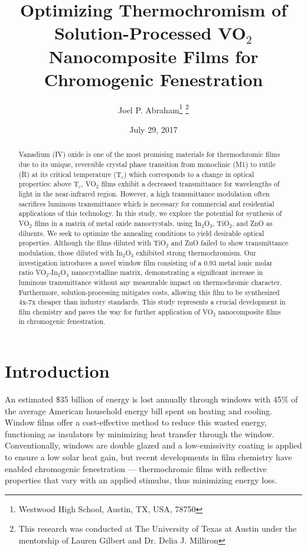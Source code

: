 \documentclass[a4paper]{article}
\title{Optimizing Thermochromism of Solution-Processed VO$_2$ Nanocomposite Films for Chromogenic Fenestration}
\date{July 29, 2017}
\author{Joel P. Abraham\footnote{Westwood High School, Austin, TX, USA, 78750} \footnote{This research was conducted at The University of Texas at Austin under the mentorship of Lauren Gilbert and Dr. Delia J. Milliron}}
\begin{document}
\maketitle


\begin{abstract}
Vanadium (IV) oxide is one of the most promising materials for thermochromic films due to its unique, reversible crystal phase transition from monoclinic (M1) to rutile (R) at its critical temperature (T$_c$) which corresponds to a change in optical properties: above T$_c$, VO$_2$ films exhibit a decreased transmittance for wavelengths of light in the near-infrared region. However, a high transmittance modulation often sacrifices luminous transmittance which is necessary for commercial and residential applications of this technology. In this study, we explore the potential for synthesis of VO$_2$ films in a matrix of metal oxide nanocrystals, using In$_2$O$_3$, TiO$_2$, and ZnO as diluents. We seek to optimize the annealing conditions to yield desirable optical properties. Although the films diluted with TiO$_2$ and ZnO failed to show transmittance modulation, those diluted with In$_2$O$_3$ exhibited strong thermochromism. Our investigation introduces a novel window film consisting of a 0.93 metal ionic molar ratio VO$_2$-In$_2$O$_3$ nanocrystalline matrix, demonstrating a significant increase in luminous transmittance without any measurable impact on thermochromic character. Furthermore, solution-processing mitigates costs, allowing this film to be synthesized 4x-7x cheaper than industry standards. This study represents a crucial development in film chemistry and paves the way for further application of VO$_2$ nanocomposite films in chromogenic fenestration.

\end{abstract}

\doublespacing
\section{Introduction}

An estimated \$35 billion of energy is lost annually through windows with 45\% of the average American household energy bill spent on heating and cooling. Window films offer a cost-effective method to reduce this wasted energy, functioning as insulators by minimizing heat transfer through the window. Conventionally, windows are double glazed and a low-emissivity coating is applied to ensure a low solar heat gain, but recent developments in film chemistry have enabled chromogenic fenestration — thermochromic films with reflective properties that vary with an applied stimulus, thus minimizing energy loss.
\end{document}
